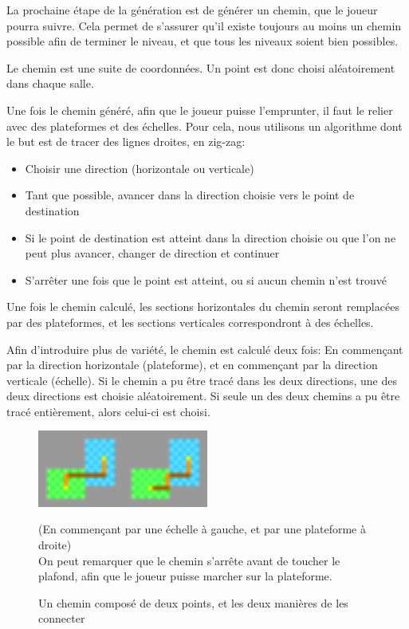 \documentclass[10pt]{report}
\begin{document}
La prochaine étape de la génération est de générer un chemin, que le 
joueur pourra suivre.
Cela permet de s'assurer qu'il existe toujours au
moins un chemin possible afin de terminer le niveau, et que tous les 
niveaux soient bien possibles.

Le chemin est une suite de coordonnées.
Un point est donc choisi aléatoirement dans chaque salle.

Une fois le chemin généré, afin que le joueur puisse l'emprunter, il
faut le relier avec des plateformes et des échelles.
Pour cela, nous utilisons un algorithme dont le but est de tracer des
lignes droites, en zig-zag:

\begin{itemize}
  \item Choisir une direction (horizontale ou verticale)
  \item Tant que possible, avancer dans la direction choisie vers le
  point de destination
  \item Si le point de destination est atteint dans la direction choisie
  ou que l'on ne peut plus avancer, changer de direction et continuer
  \item S'arrêter une fois que le point est atteint, ou si aucun chemin 
  n'est trouvé
\end{itemize}

Une fois le chemin calculé, les sections horizontales du chemin seront
remplacées par des plateformes, et les sections verticales correspondront
à des échelles.

Afin d'introduire plus de variété, le chemin est calculé deux fois:
En commençant par la direction horizontale (plateforme), et en commençant
par la direction verticale (échelle).
Si le chemin a pu être tracé dans les deux directions, une des deux directions est choisie aléatoirement.
Si seule un des deux chemins a pu être tracé entièrement, alors celui-ci est choisi.

\begin{figure}[H]
  \centering
  \includegraphics[width=0.5\textwidth]{images/two_ways_to_connect}
  \caption{Un chemin composé de deux points, et les deux manières de
  les connecter}
  (En commençant par une échelle à gauche, et par une plateforme à droite)\\
  On peut remarquer que le chemin s'arrête avant de toucher le plafond, 
  afin que le joueur puisse marcher sur la plateforme.
  \label{fig:two_ways_to_connect}
\end{figure}
\end{document}
